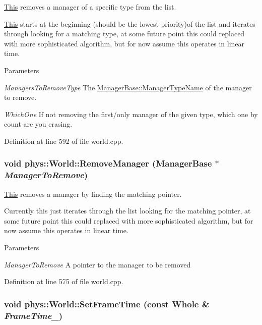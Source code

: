 \hyperlink{structThis}{This} removes a manager of a specific type from the list. 

\hyperlink{structThis}{This} starts at the beginning (should be the lowest priority)of the list and iterates through looking for a matching type, at some future point this could replaced with more sophisticated algorithm, but for now assume this operates in linear time. 
\begin{DoxyParams}{Parameters}
\item[{\em ManagersToRemoveType}]The \hyperlink{classphys_1_1ManagerBase_aaa6ccddf23892eaccb898529414f80a5}{ManagerBase::ManagerTypeName} of the manager to remove. \item[{\em WhichOne}]If not removing the first/only manager of the given type, which one by count are you erasing. \end{DoxyParams}


Definition at line 592 of file world.cpp.

\hypertarget{classphys_1_1World_ae3be85997185935421bf5230651d8e37}{
\subsubsection[{RemoveManager}]{\setlength{\rightskip}{0pt plus 5cm}void phys::World::RemoveManager ({\bf ManagerBase} $\ast$ {\em ManagerToRemove})}}
\label{da/ddf/classphys_1_1World_ae3be85997185935421bf5230651d8e37}


\hyperlink{structThis}{This} removes a manager by finding the matching pointer. 

Currently this just iterates through the list looking for the matching pointer, at some future point this could replaced with more sophisticated algorithm, but for now assume this operates in linear time. 
\begin{DoxyParams}{Parameters}
\item[{\em ManagerToRemove}]A pointer to the manager to be removed \end{DoxyParams}


Definition at line 575 of file world.cpp.

\hypertarget{classphys_1_1World_a0168122baeb30d4b90ddecdda46c8fea}{
\subsubsection[{SetFrameTime}]{\setlength{\rightskip}{0pt plus 5cm}void phys::World::SetFrameTime (const {\bf Whole} \& {\em FrameTime\_\-})}}
\label{da/ddf/classphys_1_1World_a0168122baeb30d4b90ddecdda46c8fea}



